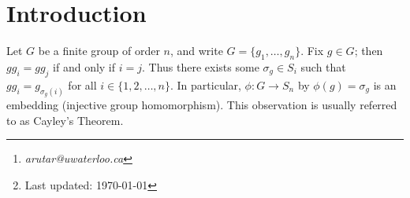 \documentclass[11pt, a4paper]{memoir}
\title{\subject}
\author{Alex Rutar\thanks{\itshape arutar@uwaterloo.ca}\\ University of Waterloo}
\date{\semester\thanks{Last updated: \today}}
\theoremstyle{change}
\theoremstyle{plain}
\theoremstyle{nonumberplain}
\numberwithin{equation}{section}
\begin{document}
\hypersetup{pageanchor=false}
\maketitle
\newpage
\frontmatter
\hypersetup{pageanchor=true}
\tableofcontents*
\newpage
\mainmatter


\chapter{Introduction}
Let $G$ be a finite group of order $n$, and write $G=\{g_1,\ldots,g_n\}$.
Fix $g\in G$; then $gg_i=gg_j$ if and only if $i=j$.
Thus there exists some $\sigma_g\in S_i$ such that $gg_i=g_{\sigma_g(i)}$ for all $i\in\{1,2,\ldots,n\}$.
In particular, $\phi:G\to S_n$ by $\phi(g)=\sigma_g$ is an embedding (injective group homomorphism).
This observation is usually referred to as Cayley's Theorem.
\end{document}
